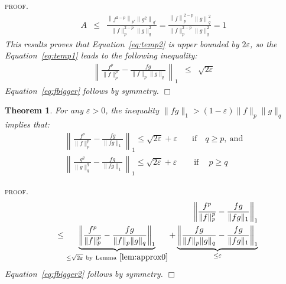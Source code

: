 \documentclass[reqno,oneside,letterpaper,10pt]{article}
\newcommand{\f}{f}
\newcommand{\g}{g}
\newcommand{\q}{q}
\def\p{p}
\newenvironment{proof}{\textsc{proof.}\it}{\hfill{$\Box$}}
\newtheorem{theorem}{Theorem}
\begin{document}
\begin{proof}
\begin{eqnarray}
A &\le&
	\frac{\left\|	\f^{2-\p} \right\|_{\p'} \left\|\g^2 \right\|_{\q'} }
		{\|\f\|^{2-\p}_\p \|\g\|_\q^2} 
	=
	\frac{\left\|	\f \right\|_{\p}^{2-\p} \left\|\g \right\|_{\q}^2 }
		{\|\f\|^{2-\p}_\p \|\g\|_\q^2}  = 1
\nonumber
\end{eqnarray}
This results proves that Equation~\eqref{eq:temp2} is upper bounded by $2\varepsilon$, so the Equation~\eqref{eq:temp1} leads to the following inequality:
\begin{eqnarray}
\left\|
	\frac{\f^{\p}}{\|\f\|^{\p}_{\p}} 
	- 
	\frac{\f\g}{\|\f\|_\p \|\g\|_\q} 
\right\|_1 &\le& 
\sqrt{2\varepsilon}
\label{eq:final}
\end{eqnarray}
Equation~\eqref{eq:fbigger} follows by symmetry. 
\end{proof}











\begin{theorem}  
\label{th:approx0}
For any $\varepsilon>0$, the inequality $\|\f\g\|_1> (1-\varepsilon) \|\f\|_\p \|\g\|_\q$ implies that:
\begin{align}
\left\|
	\frac{\f^{\p}}{\|\f\|^{\p}_{\p}} 
	- 
	\frac{\f\g}{\|\f\g\|_1} 
\right\|_1 \le \sqrt{2\varepsilon} + \varepsilon
\quad &  \mathrm{if} \quad \q\ge\p, \mathrm{\ and}
\nonumber
\\
\left\|
	\frac{\g^{\q}}{\|\g\|^{\q}_{\q}} 
	- 
	\frac{\f\g}{\|\f\g\|_1} 
\right\|_1 \le \sqrt{2\varepsilon} + \varepsilon
\quad  & \mathrm{\ if \ } \quad \p\ge\q
\label{eq:fbigger2}
\end{align}
\end{theorem} 



\begin{proof}
\begin{eqnarray}
&&\left\|
	\frac{\f^{\p}}{\|\f\|^{\p}_{\p}} 
	- 
	\frac{\f\g}{\|\f\g\|_1} 
\right\|_1
\nonumber\\
&&
\le 
\underbrace{
\left\|
	\frac{\f^{\p}}{\|\f\|^{\p}_{\p}} 
	- 
	\frac{\f\g}{\|\f\|_\p \|\g\|_\q} 
\right\|_1
}_{\le\sqrt{2\varepsilon}\ \mathrm{by~Lemma~\ref{lem:approx0} }}
+
\underbrace{
\left\|
	\frac{\f\g}{\|\f\|_\p \|\g\|_\q} 
	- 
	\frac{\f\g}{\|\f\g\|_1} 
\right\|_1
}_{\le \varepsilon}
\nonumber
\end{eqnarray}
Equation~\eqref{eq:fbigger2} follows by symmetry.
\end{proof}
\end{document}
